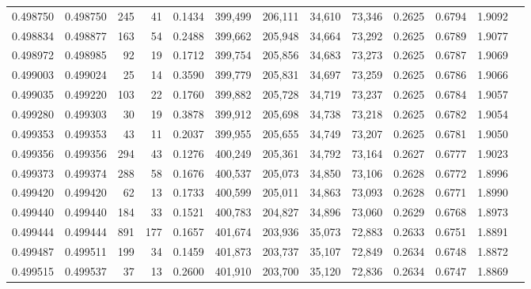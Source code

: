 \begin{tabular}{rrrrrrrrrrrrr}
0.498750 & 0.498750 &   245 &    41 &                                     0.1434 & 399,499 & 206,111 &  34,610 &  73,346 & 0.2625 & 0.6794 & 1.9092 \\
0.498834 & 0.498877 &   163 &    54 &                                     0.2488 & 399,662 & 205,948 &  34,664 &  73,292 & 0.2625 & 0.6789 & 1.9077 \\
0.498972 & 0.498985 &    92 &    19 &                                     0.1712 & 399,754 & 205,856 &  34,683 &  73,273 & 0.2625 & 0.6787 & 1.9069 \\
0.499003 & 0.499024 &    25 &    14 &                                     0.3590 & 399,779 & 205,831 &  34,697 &  73,259 & 0.2625 & 0.6786 & 1.9066 \\
0.499035 & 0.499220 &   103 &    22 &                                     0.1760 & 399,882 & 205,728 &  34,719 &  73,237 & 0.2625 & 0.6784 & 1.9057 \\
0.499280 & 0.499303 &    30 &    19 &                                     0.3878 & 399,912 & 205,698 &  34,738 &  73,218 & 0.2625 & 0.6782 & 1.9054 \\
0.499353 & 0.499353 &    43 &    11 &                                     0.2037 & 399,955 & 205,655 &  34,749 &  73,207 & 0.2625 & 0.6781 & 1.9050 \\
0.499356 & 0.499356 &   294 &    43 &                                     0.1276 & 400,249 & 205,361 &  34,792 &  73,164 & 0.2627 & 0.6777 & 1.9023 \\
0.499373 & 0.499374 &   288 &    58 &                                     0.1676 & 400,537 & 205,073 &  34,850 &  73,106 & 0.2628 & 0.6772 & 1.8996 \\
0.499420 & 0.499420 &    62 &    13 &                                     0.1733 & 400,599 & 205,011 &  34,863 &  73,093 & 0.2628 & 0.6771 & 1.8990 \\
0.499440 & 0.499440 &   184 &    33 &                                     0.1521 & 400,783 & 204,827 &  34,896 &  73,060 & 0.2629 & 0.6768 & 1.8973 \\
0.499444 & 0.499444 &   891 &   177 &                                     0.1657 & 401,674 & 203,936 &  35,073 &  72,883 & 0.2633 & 0.6751 & 1.8891 \\
0.499487 & 0.499511 &   199 &    34 &                                     0.1459 & 401,873 & 203,737 &  35,107 &  72,849 & 0.2634 & 0.6748 & 1.8872 \\
0.499515 & 0.499537 &    37 &    13 &                                     0.2600 & 401,910 & 203,700 &  35,120 &  72,836 & 0.2634 & 0.6747 & 1.8869 \\

\end{tabular}

